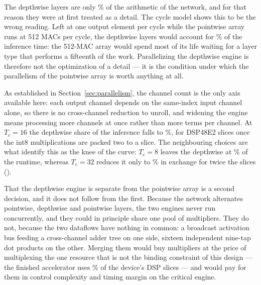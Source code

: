 The depthwise layers are only \thDwMacPct\% of the arithmetic of the network,
and for that reason they were at first treated as a detail. The cycle model
shows this to be the wrong reading. Left at one output element per cycle while
the pointwise array runs at 512 MACs per cycle, the depthwise layers would
account for \thDwShareSeq\% of the inference time: the 512-MAC array would
spend most of its life waiting for a layer type that performs a fifteenth of
the work. Parallelizing the depthwise engine is therefore not the optimization
of a detail --- it is the condition under which the parallelism of the
pointwise array is worth anything at all.

As established in Section~\ref{sec:parallelism}, the channel count is the only
axis available here: each output channel depends on the same-index input
channel alone, so there is no cross-channel reduction to unroll, and widening
the engine means processing more channels at once rather than more terms per
channel. At $T_c = 16$ the depthwise share of the inference falls to
\thDwShare\%, for \thDwDsp{} DSP48E2 slices once the int8 multiplications are
packed two to a slice. The neighbouring choices are what identify this as the
knee of the curve: $T_c = 8$ leaves the depthwise at \thDwShareEight\% of the
runtime, whereas $T_c = 32$ reduces it only to \thDwShareThirtyTwo\% in
exchange for twice the slices ().

That the depthwise engine is separate from the pointwise array is a second
decision, and it does not follow from the first. Because the network alternates
pointwise, depthwise and pointwise layers, the two engines never run
concurrently, and they could in principle share one pool of multipliers. They
do not, because the two dataflows have nothing in common: a broadcast
activation bus feeding a cross-channel adder tree on one side, sixteen
independent nine-tap dot products on the other. Merging them would buy
multipliers at the price of multiplexing the one resource that is not the
binding constraint of this design --- the finished accelerator uses
\thDspPctAccelAxi\% of the device's DSP slices --- and would pay for them in
control complexity and timing margin on the critical engine.

